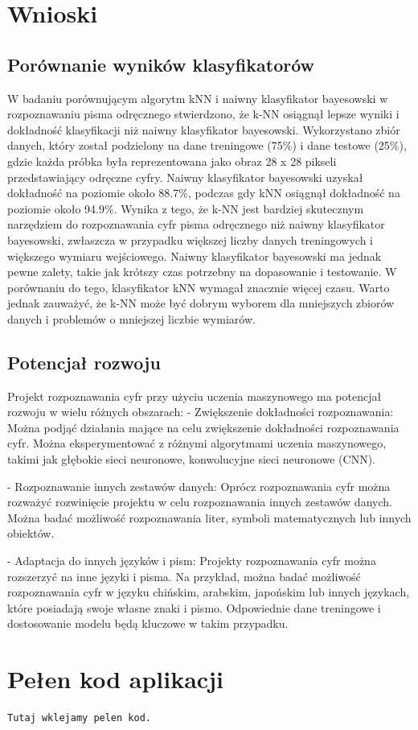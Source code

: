 \documentclass[12pt,a4paper]{article}
\begin{document}
\section{Wnioski}
\subsection{Porównanie wyników klasyfikatorów}
W badaniu porównującym algorytm kNN i naiwny klasyfikator
bayesowski w rozpoznawaniu pisma odręcznego stwierdzono, że k-NN osiągnął lepsze
wyniki i dokładność klasyfikacji niż naiwny klasyfikator bayesowski. Wykorzystano
zbiór danych, który został podzielony na dane treningowe (75\%) i dane testowe (25\%),
gdzie każda próbka była reprezentowana jako obraz 28 x 28 pikseli przedstawiający odręczne cyfry.
Naiwny klasyfikator bayesowski uzyskał dokładność na poziomie około 88.7\%, podczas gdy kNN osiągnął
dokładność na poziomie około 94.9\%. Wynika z tego, że k-NN
jest bardziej skutecznym narzędziem do rozpoznawania cyfr pisma odręcznego niż naiwny klasyfikator
bayesowski, zwłaszcza w przypadku większej liczby danych treningowych i większego wymiaru wejściowego.
Naiwny klasyfikator bayesowski ma jednak pewne zalety, takie jak krótszy czas potrzebny na dopasowanie i
testowanie. W porównaniu do tego, klasyfikator kNN wymagał znacznie więcej czasu. Warto jednak zauważyć,
że k-NN może być dobrym wyborem dla mniejszych zbiorów danych i problemów o mniejszej liczbie wymiarów.
\subsection{Potencjał rozwoju}

Projekt rozpoznawania cyfr przy użyciu uczenia maszynowego ma potencjał rozwoju w wielu różnych obszarach:
- Zwiększenie dokładności rozpoznawania: Można podjąć działania mające na celu zwiększenie dokładności
rozpoznawania cyfr. Można eksperymentować z różnymi algorytmami uczenia maszynowego, takimi
jak głębokie sieci neuronowe, konwolucyjne sieci neuronowe (CNN).

- Rozpoznawanie innych zestawów danych: Oprócz rozpoznawania cyfr można rozważyć rozwinięcie projektu w celu
rozpoznawania innych zestawów danych. Można badać możliwość rozpoznawania liter, symboli matematycznych
lub innych obiektów.

- Adaptacja do innych języków i pism: Projekty rozpoznawania cyfr można rozszerzyć na inne języki i pisma.
Na przykład, można badać możliwość rozpoznawania cyfr w języku chińskim, arabskim, japońskim lub innych językach,
które posiadają swoje własne znaki i pismo. Odpowiednie dane treningowe i dostosowanie modelu
będą kluczowe w takim przypadku.
\section{Pełen kod aplikacji}
\begin{lstlisting}
Tutaj wklejamy pelen kod. 
\end{lstlisting}
\end{document}
